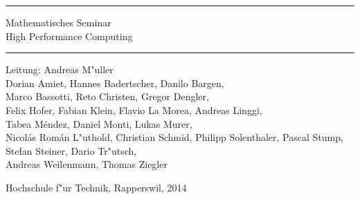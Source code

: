 \documentclass[a4paper]{book}
\begin{document}
\pagestyle{fancy}
\frontmatter
\newcommand\HRule{\noindent\rule{\linewidth}{1.5pt}}
\begin{titlepage}
\HRule
\vspace*{5pt}
\begin{flushright}
{
\LARGE
Mathematisches Seminar\\
\vspace*{20pt}
\Huge
High Performance Computing}
\end{flushright}
\HRule
\begin{flushright}
\vspace{60pt}
\Large
Leitung: Andreas M"uller\\
\vspace{40pt}
\Large
Dorian Amiet,
Hannes Badertscher,
Danilo Bargen,\\
Marco Bassotti,
Reto Christen,
Gregor Dengler,\\
Felix Hofer,
Fabian Klein,
Flavio La Morea,
Andreas Linggi,\\
Tabea M\'endez,
Daniel Monti,
Lukas Murer,\\
Nicol\'as Rom\'an L"uthold,
Christian Schmid,
Philipp Solenthaler,
Pascal Stump,
Stefan Steiner,
Dario Tr"utsch,\\
Andreas Weilenmann,
Thomas Ziegler
\end{flushright}
\begin{center}
Hochschule f"ur Technik, Rapperswil, 2014
\end{center}
\end{titlepage}
\hypersetup{
    colorlinks=true,
    linktoc=all,
    linkcolor=blue
}
\newenvironment{beispiele}{
\bgroup\smallskip\parindent0pt\bf Beispiele\egroup

\begin{list}{\arabic{beispiel}.}
  {\usecounter{beispiel}
  \setlength{\labelsep}{5mm}
  \setlength{\rightmargin}{0pt}
}}{\end{list}}

\newenvironment{teilaufgaben}{
\begin{enumerate}
\renewcommand{\labelenumi}{\alph{enumi})}
}{\end{enumerate}}
\def\swallow#1{
}
\newenvironment{loesung}{%
\begin{proof}[L"osung]%
\renewcommand{\qedsymbol}{$\bigcirc$}
}{\end{proof}}
\def\keineloesungen{%
\renewenvironment{loesung}{\swallow\begingroup}{\endgroup}%
}
\end{document}
